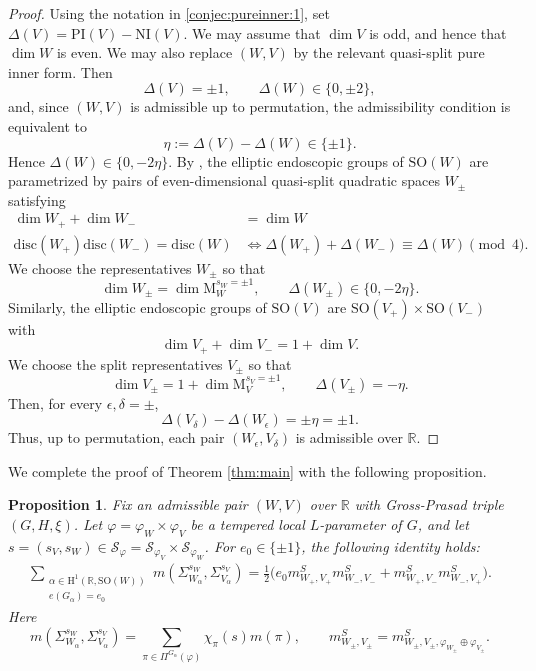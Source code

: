 \documentclass[12pt]{amsart}
\numberwithin{equation}{subsection}
\newcommand{\BR}{{\mathbb {R}}}
\newcommand{\CS}{{\mathcal {S}}}
\newcommand{\RH}{{\mathrm {H}}}
\newcommand{\RM}{{\mathrm {M}}}
\newcommand{\disc}{{\mathrm{disc }}}
\newcommand{\SO}{{\mathrm{SO}}}
\def\alp{{\alpha}}
\def\Del{{\Delta}}
\def\Sig{{\Sigma}}
\def\vphi{\varphi}
\def\SO{\mathrm{SO}}
\newtheorem{pro}[thm]{Proposition}
\begin{document}
\begin{proof}
Using the notation in \eqref{conjec:pureinner:1}, set
$
\Del(V)=\mathrm{PI}(V)-\mathrm{NI}(V).
$
We may assume that $\dim V$ is odd, and hence that $\dim W$ is even. We may
also replace $(W,V)$ by the relevant quasi-split pure inner form. Then
\[
\Del(V)=\pm1,\qquad \Del(W)\in\{0,\pm2\},
\]
and, since $(W,V)$ is admissible up to permutation, the admissibility condition
is equivalent to
\[
\eta:=\Del(V)-\Del(W)\in\{\pm1\}.
\]
Hence
$
\Del(W)\in\{0,-2\eta\}.
$
By \cite[\S 1.7]{MR3155345}, the elliptic endoscopic groups of $\SO(W)$ are
parametrized by pairs of even-dimensional quasi-split quadratic spaces
$W_\pm$ satisfying
\begin{align*}
\dim W_+ +\dim W_-&=\dim W
\\
\disc(W_+)\disc(W_-)=\disc(W)
&\Longleftrightarrow
\Del(W_+)+\Del(W_-)\equiv \Del(W)\pmod{4}.
\end{align*}
We choose the representatives $W_\pm$ so that
\[
\dim W_\pm=\dim\RM_W^{s_W=\pm1},\qquad
\Del(W_\pm)\in\{0,-2\eta\}.
\]
Similarly, the elliptic endoscopic groups of $\SO(V)$ are
$\SO(V_+)\times\SO(V_-)$ with
\[
\dim V_+ +\dim V_-=1+\dim V.
\]
We choose the split representatives $V_\pm$ so that
\[
\dim V_\pm=1+\dim\RM_V^{s_V=\pm1},\qquad
\Del(V_\pm)=-\eta.
\]
Then, for every $\epsilon,\delta=\pm$,
\[
\Del(V_\delta)-\Del(W_\epsilon)=\pm\eta=\pm1.
\]
Thus, up to permutation, each pair $(W_\epsilon,V_\delta)$ is admissible over
$\BR$.
\end{proof}

We complete the proof of Theorem \ref{thm:main} with the following proposition.
\begin{pro}\label{pro:endoscopicid}
Fix an admissible pair $(W,V)$ over $\BR$ with Gross-Prasad triple $(G,H,\xi)$. Let $\vphi = \vphi_W\times \vphi_V$ be a tempered local $L$-parameter of $G$, and let $s=(s_V,s_W)\in \CS_\vphi = \CS_{\vphi_V}\times \CS_{\vphi_W}$. For $e_0\in \{\pm 1\}$, the following identity holds:
\begin{align}\label{eq:endoscopicid}
\sum_{
\substack{
\alp\in \RH^1(\BR,\SO(W))
\\
e(G_\alp) = e_0
}
}
m(\Sig^{s_W}_{W_\alp},\Sig^{s_V}_{V_\alp})
=
\frac{1}{2}
\big(
e_0 m^S_{W_+,V_+} m^S_{W_-,V_-}
+
m^S_{W_+,V_-} m^S_{W_-,V_+}
\big).
\end{align}
Here
\[
m(\Sig^{s_W}_{W_\alp},\Sig^{s_V}_{V_\alp}) =
\sum_{
\pi\in \Pi^{G_\alp}(\vphi)}
\chi_\pi(s)
 m(\pi)
,\qquad
m^S_{W_\pm,V_\pm} = m^S_{W_\pm,V_\pm,\vphi_{W_\pm}\oplus \vphi_{V_\pm}}.
\]
\end{pro}
\end{document}
